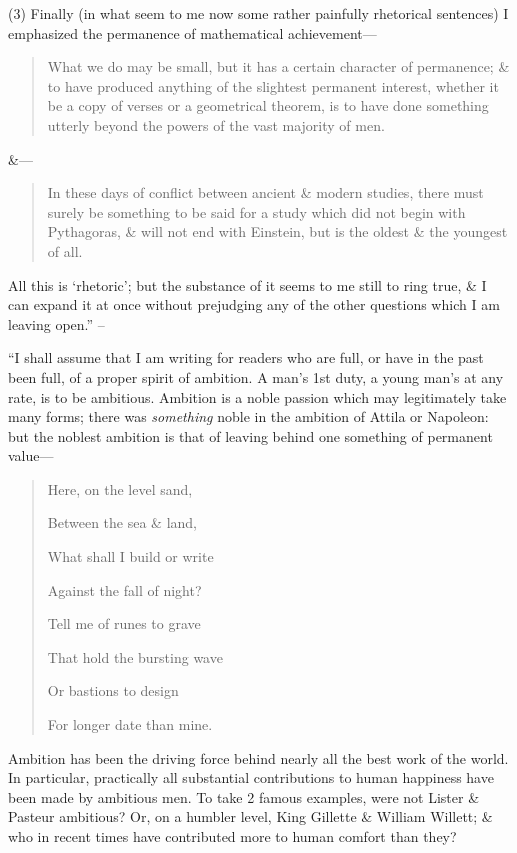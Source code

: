 \documentclass{article}
\numberwithin{equation}{section}
\begin{document}
(3) Finally (in what seem to me now some rather painfully rhetorical sentences) I emphasized the permanence of mathematical achievement---
\begin{quotation}
	What we do may be small, but it has a certain character of permanence; \& to have produced anything of the slightest permanent interest, whether it be a copy of verses or a geometrical theorem, is to have done something utterly beyond the powers of the vast majority of men.
\end{quotation}
\&---
\begin{quotation}
	In these days of conflict between ancient \& modern studies, there must surely be something to be said for a study which did not begin with Pythagoras, \& will not end with Einstein, but is the oldest \& the youngest of all.
\end{quotation}
All this is `rhetoric'; but the substance of it seems to me still to ring true, \& I can expand it at once without prejudging any of the other questions which I am leaving open.'' -- \cite[pp. 74--77]{Hardy1992}

 ``I shall assume that I am writing for readers who are full, or have in the past been full, of a proper spirit of ambition. A man's 1st duty, a young man's at any rate, is to be ambitious. Ambition is a noble passion which may legitimately take many forms; there was \textit{something} noble in the ambition of Attila or Napoleon: but the noblest ambition is that of leaving behind one something of permanent value---
\begin{quotation}
	Here, on the level sand,
	
	Between the sea \& land,
	
	What shall I build or write
	
	Against the fall of night?
	
	
	Tell me of runes to grave
	
	That hold the bursting wave
	
	Or bastions to design
	
	For longer date than mine.
\end{quotation}
Ambition has been the driving force behind nearly all the best work of the world. In particular, practically all substantial contributions to human happiness have been made by ambitious men. To take 2 famous examples, were not Lister \& Pasteur ambitious? Or, on a humbler level, King Gillette \& William Willett; \& who in recent times have contributed more to human comfort than they?
\end{document}
